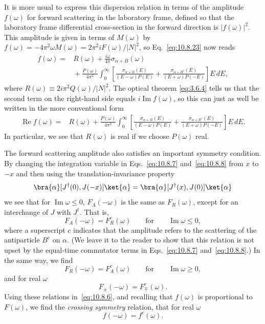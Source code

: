 It is more usual to express this dispersion relation in terms of the
amplitude $f(\omega)$ for forward scattering in the laboratory frame,
defined so that the laboratory frame differential cross-section in the forward
direction is $|f(\omega)|^2$. This amplitude is given in terms of $M(\omega)$
by $f(\omega)=-4\pi^2\omega M(\omega)=2\pi^2iF(\omega)/|N|^2$, so
Eq.~\eqref{eq:10.8.23} now reads
\begin{align*}
  f(\omega)={}&R(\omega)+\frac{i\omega}{4\pi}
  \sigma_{\alpha+B}(\omega)\\
  &{}+\frac{P(\omega)}{4\pi^2}\int_0^\infty
  \left[\frac{\sigma_{\alpha+B}(E)}{(E-\omega)P(E)}
  +\frac{\sigma_{\alpha+B^c}(E)}{(E+\omega)P(-E)}\right]E\,dE,
\end{align*}
where $R(\omega)\equiv2i\pi^2Q(\omega)/|N|^2$. The optical theorem
\eqref{eq:3.6.4} tells us that the second term on the right-hand side equals
$i\operatorname{Im}f(\omega)$, so this can just as well be written in the more
conventional form
\begin{align}
  \operatorname{Re}f(\omega)={}&R(\omega)
  +\frac{P(\omega)}{4\pi^2}\int_0^\infty
  \left[\frac{\sigma_{\alpha+B}(E)}{(E-\omega)P(E)}
  +\frac{\sigma_{\alpha+B^c}(E)}{(E+\omega)P(-E)}\right]E\,dE.
  \tag{10.8.24}\label{eq:10.8.24}
\end{align}
In particular, we see that $R(\omega)$ is real if we choose $P(\omega)$ real.

The forward scattering amplitude also satisfies an important symmetry
condition. By changing the integration variable in Eqs.~\eqref{eq:10.8.7}
and~\eqref{eq:10.8.8} from $x$ to $-x$ and then using the
translation-invariance property
\begin{equation*}
  \bra{\alpha}[J^\dagger(0),J(-x)]\ket{\alpha}
  =\bra{\alpha}[J^\dagger(x),J(0)]\ket{\alpha}
\end{equation*}
we see that for $\operatorname{Im}\omega\leq0$, $F_A(-\omega)$ is the same
as $F_R(\omega)$, except for an interchange of $J$ with $J^\dagger$. That is,
\begin{equation*}
  F_A(-\omega)=F_R^c(\omega)
  \qquad\text{for}\qquad\operatorname{Im}\omega\leq0,
\end{equation*}
where a superscript $c$ indicates that the amplitude refers to the scattering
of the antiparticle $B^c$ on $\alpha$. (We leave it to the reader to show
that this relation is not upset by the equal-time commutator terms in
Eqs.~\eqref{eq:10.8.7} and~\eqref{eq:10.8.8}.) In the same way, we find
\begin{equation*}
  F_R(-\omega)=F_A^c(\omega)
  \qquad\text{for}\qquad\operatorname{Im}\omega\geq0,
\end{equation*}
and for real $\omega$
\begin{equation*}
  F_\pm(-\omega)=F_\mp^c(\omega).
\end{equation*}
Using these relations in~\eqref{eq:10.8.6}, and recalling that $f(\omega)$ is
proportional to $F(\omega)$, we find the \emph{crossing symmetry} relation,
that for real $\omega$
\begin{equation}
  f(-\omega)=f^c(\omega).
  \tag{10.8.25}\label{eq:10.8.25}
\end{equation}

